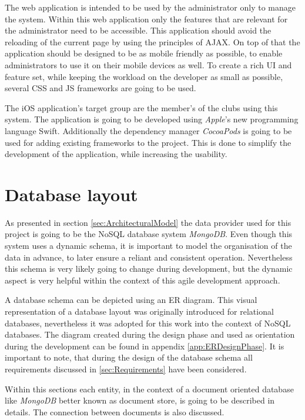 The web application is intended to be used by the administrator only to manage the system. Within this web application only the features that are relevant for the administrator need to be accessible. This application should avoid the reloading of the current page by using the principles of \gls{AJAX}. On top of that the application should be designed to be as mobile friendly as possible, to enable administrators to use it on their mobile devices as well. To create a rich \gls{UI} and feature set, while keeping the workload on the developer as small as possible, several \gls{CSS} and \gls{JS} frameworks are going to be used.

The iOS application's target group are the member's of the clubs using this system. The application is going to be developed using \emph{Apple}'s new programming language \gls{Swift}. Additionally the dependency manager \emph{CocoaPods} is going to be used for adding existing frameworks to the project. This is done to simplify the development of the application, while increasing the usability.

\section{Database layout}
\label{sec:DatabaseLayout}

As presented in section \vref{sec:ArchitecturalModel} the data provider used for this project is going to be the \gls{NoSQL} database system \emph{MongoDB}. Even though this system uses a dynamic schema, it is important to model the organisation of the data in advance, to later ensure a reliant and consistent operation. Nevertheless this schema is very likely going to change during development, but the dynamic aspect is very helpful within the context of this agile development approach.

A database schema can be depicted using an \gls{ER} diagram. This visual representation of a database layout was originally introduced for relational databases, nevertheless it was adopted for this work into the context of \gls{NoSQL} databases. The diagram created during the design phase and used as orientation during the development can be found in appendix \vref{app:ERDesignPhase}. It is important to note, that during the design of the database schema all requirements discussed in \vref{sec:Requirements} have been considered.

Within this sections each entity, in the context of a document oriented database like \emph{MongoDB} better known as document store, is going to be described in details. The connection between documents is also discussed.

